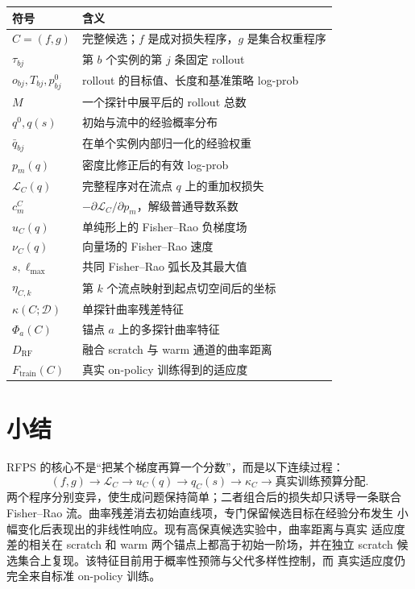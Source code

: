 \documentclass[UTF8,11pt]{ctexart}
\newcommand{\RFPS}{\textsc{RFPS}}
\begin{document}
\begin{table}[h]
\centering
\begin{tabularx}{\linewidth}{>{\centering\arraybackslash}p{2.4cm}X}
\toprule
符号 & 含义\\
\midrule
\(C=(f,g)\) & 完整候选；\(f\) 是成对损失程序，\(g\) 是集合权重程序\\
\(\tau_{bj}\) & 第 \(b\) 个实例的第 \(j\) 条固定 rollout\\
\(o_{bj},T_{bj},p^0_{bj}\) & rollout 的目标值、长度和基准策略 log-prob\\
\(M\) & 一个探针中展平后的 rollout 总数\\
\(q^0,q(s)\) & 初始与流中的经验概率分布\\
\(\bar q_{bj}\) & 在单个实例内部归一化的经验权重\\
\(p_m(q)\) & 密度比修正后的有效 log-prob\\
\(\mathcal L_C(q)\) & 完整程序对在流点 \(q\) 上的重加权损失\\
\(c_m^C\) & \(-\partial\mathcal L_C/\partial p_m\)，解级普通导数系数\\
\(u_C(q)\) & 单纯形上的 Fisher--Rao 负梯度场\\
\(\nu_C(q)\) & 向量场的 Fisher--Rao 速度\\
\(s,\ell_{\max}\) & 共同 Fisher--Rao 弧长及其最大值\\
\(\eta_{C,k}\) & 第 \(k\) 个流点映射到起点切空间后的坐标\\
\(\kappa(C;\mathcal D)\) & 单探针曲率残差特征\\
\(\Phi_a(C)\) & 锚点 \(a\) 上的多探针曲率特征\\
\(D_{\mathrm{RF}}\) & 融合 scratch 与 warm 通道的曲率距离\\
\(F_{\mathrm{train}}(C)\) & 真实 on-policy 训练得到的适应度\\
\bottomrule
\end{tabularx}
\end{table}

\section{小结}

\RFPS{} 的核心不是“把某个梯度再算一个分数”，而是以下连续过程：
\[
    (f,g)
    \longrightarrow
    \mathcal L_C
    \longrightarrow
    u_C(q)
    \longrightarrow
    q_C(s)
    \longrightarrow
    \kappa_C
    \longrightarrow
    \text{真实训练预算分配}.
\]
两个程序分别变异，使生成问题保持简单；二者组合后的损失却只诱导一条联合
Fisher--Rao 流。曲率残差消去初始直线项，专门保留候选目标在经验分布发生
小幅变化后表现出的非线性响应。现有高保真候选实验中，曲率距离与真实
适应度差的相关在 scratch 和 warm 两个锚点上都高于初始一阶场，并在独立
scratch 候选集合上复现。该特征目前用于概率性预筛与父代多样性控制，而
真实适应度仍完全来自标准 on-policy 训练。



\end{document}
